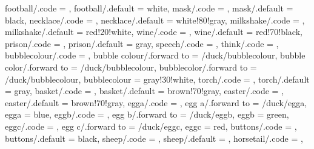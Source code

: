 {  football/.code            = \duck@footballtrue    
                              \def\duck@football{#1},
  football/.default         = white,
  mask/.code                = \duck@masktrue        
                              \def\duck@mask{#1},
  mask/.default             = black,
  necklace/.code            = \duck@necklacetrue    
                              \def\duck@necklace{#1},
  necklace/.default         = white!80!gray,
  milkshake/.code           = \duck@milkshaketrue   
                              \def\duck@milkshake{#1},
  milkshake/.default        = red!20!white,
  wine/.code                = \duck@winetrue        
                              \def\duck@wine{#1},  
  wine/.default             = red!70!black,
  prison/.code              = \duck@prisontrue      
                              \def\duck@prison{#1},
  prison/.default           = gray,
  speech/.code              = \duck@speechtrue      
                              \def\duck@speech{#1},
  think/.code               = \duck@thinktrue       
                              \def\duck@think{#1},
  bubblecolour/.code        = \def\duck@bubblecolour{#1},
  bubble colour/.forward to = /duck/bubblecolour,
  bubble color/.forward to  = /duck/bubblecolour,
  bubblecolor/.forward to   = /duck/bubblecolour,  
  bubblecolour              = gray!30!white,
  torch/.code               = \duck@torchtrue       
                              \def\duck@torch{#1},
  torch/.default            = gray,
  basket/.code              = \duck@baskettrue      
                              \def\duck@basket{#1},
  basket/.default           = brown!70!gray,
  easter/.code              = \duck@eastertrue
                              \duck@baskettrue      
                              \def\duck@basket{#1},
  easter/.default           = brown!70!gray,                       
  egga/.code                = \def\duck@egga{#1},
  egg a/.forward to         = /duck/egga,
  egga                      = blue,
  eggb/.code                = \def\duck@eggb{#1},
  egg b/.forward to         = /duck/eggb,
  eggb                      = green,
  eggc/.code                = \def\duck@eggc{#1},
  egg c/.forward to         = /duck/eggc,
  eggc                      = red,
  buttons/.code             = \duck@buttonstrue     
                              \def\duck@buttons{#1},
  buttons/.default          = black,
  sheep/.code               = \duck@sheeptrue       
                              \def\duck@sheep{#1},
  sheep/.default            = \duck@body,
  horsetail/.code           = \duck@horsetailtrue   
                              \def\duck@horsetail{#1},
}
